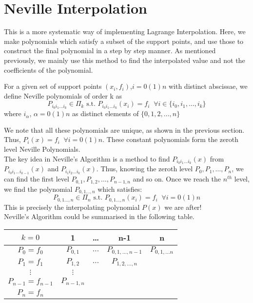 \section{Neville Interpolation}
This is a more systematic way of implementing Lagrange Interpolation. Here, we make polynomials which satisfy a subset of the support points, and use those to construct the final polynomial in a step by step manner. As mentioned previously, we mainly use this method to find the interpolated value and not the coefficients of the polynomial.\\

\begin{defn}
    For a given set of support points $(x_i,f_i)$,$i = 0(1)n$ with distinct abscissae, we define Neville polynomials of order k as
    $$P_{i_0i_1\dots i_k} \in \Pi_k \text{    s.t.    } P_{i_0i_1\dots i_k}(x_i) = f_i\;\;\forall i \in \{i_0,i_1,\dots,i_k\}$$
    where $i_\alpha$, $\alpha = 0(1)n $ as distinct elements of $\{0,1,2,\dots,n\}$
\end{defn}

We note that all these polynomials are unique, as shown in the previous section.\\
Thus, $P_{i}(x) = f_{i}\;\;\forall i = 0(1)n$. These constant polynomials form the zeroth level  Neville Polynomials.\\
The key idea in Neville's Algorithm is a method to find $P_{i_0i_1\dots i_k}(x)$ from $P_{i_0i_1\dots i_{k-1}}(x)$ and $P_{i_1i_2\dots i_k}(x)$. Thus, knowing the zeroth level $P_0, P_1,\dots, P_n$, we can find the first level $P_{0,1}, P_{1,2},\dots, P_{n-1,n}$ and so on. Once we reach the $n^{th}$ level, we find the polynomial $P_{0,1\dots, n}$ which satisfies:
$$P_{0,1\dots, n} \in \Pi_n \text{    s.t.    } P_{0,1\dots, n}(x_i) = f_i\;\;\forall i = 0(1)n $$
This is precisely the interpolating polynomial $P(x)$ we are after!\\[0.2 cm]
Neville's Algorithm could be summarised in the following table.\\[0.2 cm]


\begin{center}
   \begin{tabular}{|ccccc|}
        \hline
        $k = 0$& 1 &\dots & n-1 & n\\
        \hline
        $ P_0 = f_0$& $P_{0,1}$ & $\dots$ & $P_{0,1,\dots,n-1}$ & $P_{0,1,\dots n}$\\
        $ P_1 = f_1$ & $P_{1,2}$ & $\dots$ & $P_{1,2,\dots,n}$&\\
        $\vdots$ & $\vdots$ &  &  & \\
        $ P_{n-1} = f_{n-1}$ & $P_{n-1,n}$ &  & & \\
        $ P_{n} = f_{n}$ & & & & \\
        \hline
    \end{tabular}
\end{center}



